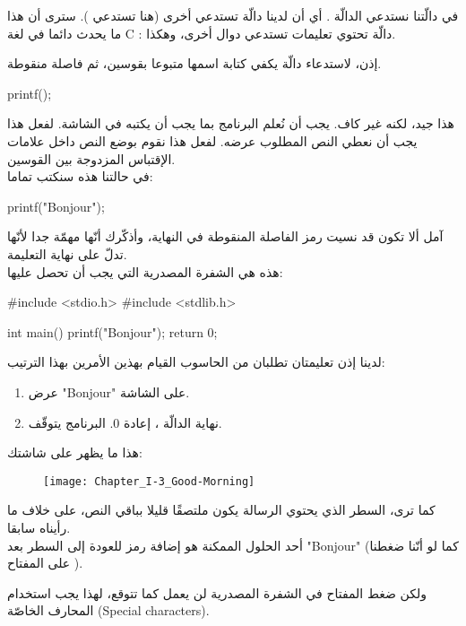 في دالّتنا
نستدعي الدالّة
 .
 أي أن لدينا دالّة تستدعي أخرى (هنا
تستدعي
).
سترى أن هذا ما يحدث دائما في لغة
\textenglish{C}
: دالّة تحتوي تعليمات تستدعي دوال أخرى، وهكذا.

إذن، لاستدعاء دالّة يكفي كتابة اسمها متبوعا بقوسين، ثم فاصلة منقوطة.

\begin{Csource}
printf();
\end{Csource}

هذا جيد، لكنه غير كاف. يجب أن نُعلم البرنامج بما يجب أن يكتبه في الشاشة. لفعل هذا يجب أن نعطي
النص المطلوب عرضه. لفعل هذا نقوم بوضع النص داخل علامات الإقتباس المزدوجة بين القوسين.\\
في حالتنا هذه سنكتب تماما:

\begin{Csource}
printf("Bonjour");
\end{Csource}

آمل ألا تكون قد نسيت رمز الفاصلة المنقوطة في النهاية، وأذكّرك أنّها مهمّة جدا لأنّها تدلّ على نهاية التعليمة.\\
هذه هي الشفرة المصدرية التي يجب أن تحصل عليها:

\begin{Csource}
#include <stdio.h>
#include <stdlib.h>

int main()
{
    printf("Bonjour");
    return 0;
}
\end{Csource}

لدينا إذن تعليمتان تطلبان من الحاسوب القيام بهذين الأمرين بهذا الترتيب:
\begin{enumerate}
  \item عرض
"\textenglish{Bonjour}"
على الشاشة.
  \item نهاية الدالّة
،
إعادة 0. البرنامج يتوقّف.
\end{enumerate}

هذا ما يظهر على شاشتك:

\begin{figure}[H]
	\centering
	\texttt{[image: Chapter\_I-3\_Good-Morning]}
\end{figure}

كما ترى، السطر الذي يحتوي الرسالة يكون ملتصقًا قليلا بباقي النص، على خلاف ما رأيناه سابقا.\\
أحد الحلول الممكنة هو إضافة رمز للعودة إلى السطر بعد
 "\textenglish{Bonjour}"
 (كما لو أنّنا ضغطنا على المفتاح
).

ولكن ضغط المفتاح
 في الشفرة المصدرية لن يعمل كما تتوقع، لهذا يجب استخدام المحارف الخاصّة
(\textenglish{Special characters}).

